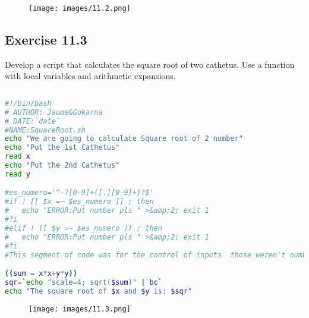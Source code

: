 \documentclass[12pt, titlepage,]{article}
\begin{document}
\begin{figure}[h] %
\centering
{\texttt{[image: images/11.2.png]}}
\end{figure} 

\subsection{Exercise 11.3}
Develop a script that calculates the square root of two cathetus. Use a function with local variables
and arithmetic expansions.
\begin{lstlisting}[language=Bash]
                        
#!/bin/bash
# AUTHOR: Jaume&Gokarna
# DATE:`date` 
#NAME:SquareRoot.sh
echo "We are going to calculate Square root of 2 number"
echo "Put the 1st Cathetus"
read x
echo "Put the 2nd Cathetus"
read y

#es_numero='^-?[0-9]+([.][0-9]+)?$'
#if ! [[ $x =~ $es_numero ]] ; then
#   echo "ERROR:Put number pls " >&amp;2; exit 1
#fi
#elif ! [[ $y =~ $es_numero ]] ; then
#   echo "ERROR:Put number pls " >&amp;2; exit 1
#fi
#This segment of code was for the control of inputs  those weren't numbers.

((sum = x*x+y*y))
sqr=`echo "scale=4; sqrt($sum)" | bc`
echo "The square root of $x and $y is: $sqr"

\end{lstlisting}

\begin{figure}[h] %
\centering
{\texttt{[image: images/11.3.png]}}
\end{figure} 
\clearpage
\end{document}
